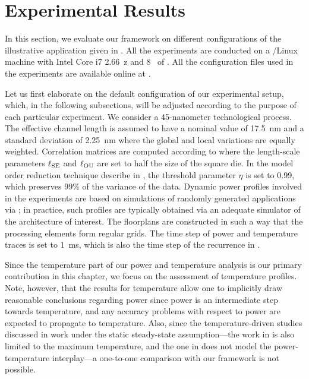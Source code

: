 \section{Experimental Results}

In this section, we evaluate our framework on different configurations of the
illustrative application given in . All the experiments
are conducted on a /Linux machine with Intel Core i7 2.66~z and
8~ of . All the configuration files used in the experiments are
available online at \cite{eslab2014}.

Let us first elaborate on the default configuration of our experimental setup,
which, in the following subsections, will be adjusted according to the purpose
of each particular experiment. We consider a 45-nanometer technological process.
The effective channel length is assumed to have a nominal value of 17.5~nm
\cite{ptm} and a standard deviation of 2.25~nm where the global and local
variations are equally weighted. Correlation matrices are computed according to
 where the length-scale parameters $\ell_{\mathrm{SE}}$ and
$\ell_{\mathrm{OU}}$ are set to half the size of the square die. In the model order
reduction technique describe in , the threshold
parameter $\eta$ is set to 0.99, which preserves 99\% of the variance of the
data. Dynamic power profiles involved in the experiments are based on
simulations of randomly generated applications via \cite{dick1998}; in practice,
such profiles are typically obtained via an adequate simulator of the
architecture of interest. The floorplans are constructed in such a way that the
processing elements form regular grids. The time step of power and temperature
traces is set to 1~ms, which is also the time step of the recurrence in
.

Since the temperature part of our power and temperature analysis is our primary
contribution in this chapter, we focus on the assessment of temperature
profiles. Note, however, that the results for temperature allow one to
implicitly draw reasonable conclusions regarding power since power is an
intermediate step towards temperature, and any accuracy problems with respect to
power are expected to propagate to temperature. Also, since the
temperature-driven studies \cite{juan2011, juan2012, huang2009a, lee2013}
discussed in  work under the static steady-state
assumption---the work in \cite{juan2011} is also limited to the maximum
temperature, and the one in \cite{huang2009a} does not model the
power-temperature interplay---a one-to-one comparison with our framework is not
possible.

